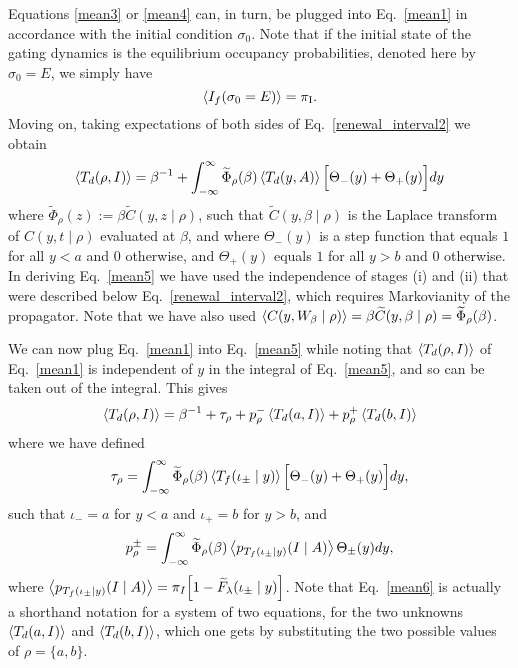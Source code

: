 %
Equations \eqref{mean3} or \eqref{mean4} can, in turn, be plugged into Eq.~\eqref{mean1} in accordance with the initial condition $\sigma_0$. Note that if the initial state of the gating dynamics is the equilibrium occupancy probabilities, denoted here by $\sigma_0=E$, we simply have
%
\begin{equation}
\Braket{I_f (\sigma_0=E)}=\pi_{\textrm{I}}.   
\end{equation}
%
Moving on, taking expectations of both sides of Eq.~\eqref{renewal_interval2} we obtain
%
\begin{align} \label{mean5}
\Braket{T_d(\rho, I)} =\beta^{-1}  + \int^{\infty}_{-\infty} \widetilde{\Phi}_{\rho}(\beta)  \Braket{T_d(y,A)} \Big[\Theta_{-}(y)+\Theta_{+}(y)\Big] dy
\end{align}
%
where $\widetilde{\Phi}_{\rho}(z):=\beta \widetilde{C}(y,z \mid \rho)$, such that $\widetilde{C}(y,\beta \mid \rho)$ is the Laplace transform of $C(y, t \mid \rho)$ evaluated at $\beta$, and where $\Theta_{-}(y)$ is a step function that equals $1$ for all $y<a$ and $0$ otherwise, and $\Theta_{+}(y)$ equals $1$ for all $y>b$ and $0$ otherwise. In deriving Eq.~\eqref{mean5} we have used the independence of stages (i) and (ii) that were described below Eq.~\ref{renewal_interval2}, which requires Markovianity of the propagator. Note that we have also used $\Braket{C(y,W_\beta \mid \rho)}=\beta \widetilde{C}(y,\beta \mid \rho)=\widetilde{\Phi}_{\rho}(\beta)$. 

We can now plug Eq.~\eqref{mean1} into Eq.~\eqref{mean5} while noting that $\Braket{T_d(\rho, I)}$ of Eq.~\eqref{mean1} is independent of $y$ in the integral of Eq.~\eqref{mean5}, and so can be taken out of the integral. This gives
%
\begin{align} 
\label{mean6}
     \Braket{T_d(\rho, I)} = \beta^{-1} + \tau_{\rho} 
+  p^{-}_{\rho} \Braket{T_d(a, I)} +  p^{+}_{\rho} \Braket{T_d(b, I)}
\end{align}
%
where we have defined
%
\begin{equation} \label{mean7}
\tau_{\rho} = \int^{\infty}_{-\infty} \widetilde{\Phi}_{\rho}(\beta) \braket{T_f(\iota_{\pm}\mid y)}  \Big[\Theta_{-}(y)+\Theta_{+}(y)\Big] dy , 
\end{equation}
%
such that $\iota_- = a$ for $y<a$ and $\iota_+ = b$ for $y>b$, and
%
\begin{equation} \label{mean8}
  p^{\pm}_{\rho} =  \int^{\infty}_{-\infty} \widetilde{\Phi}_{\rho}(\beta)
 \Braket{p_{T_f(\iota_\pm \mid y ) }(I\mid A)}   \Theta_{\pm}(y) dy ,
\end{equation}
%
where $\Braket{p_{T_f(\iota_{\pm}\mid y )}(I \mid A)}=\pi_{I}\Big[ 1  - \widetilde{F}_{\lambda}(\iota_{\pm} \mid y) \Big]$. Note that Eq.~\eqref{mean6} is actually a shorthand notation for a system of two equations, for the two unknowns $\Braket{T_d(a, I)}$ and $\Braket{T_d(b,I)}$, which one gets by substituting the two possible values of $\rho=\{a,b\}$. 

